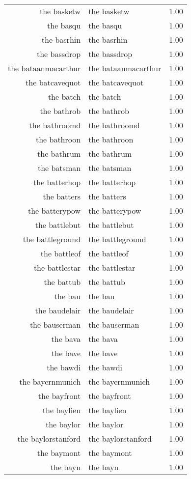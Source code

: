 \begin{table}[ht]
\begin{tabular}{rlr}
  the basketw & the basketw & 1.00 \\ 
  the basqu & the basqu & 1.00 \\ 
  the basrhin & the basrhin & 1.00 \\ 
  the bassdrop & the bassdrop & 1.00 \\ 
  the bataanmacarthur & the bataanmacarthur & 1.00 \\ 
  the batcavequot & the batcavequot & 1.00 \\ 
  the batch & the batch & 1.00 \\ 
  the bathrob & the bathrob & 1.00 \\ 
  the bathroomd & the bathroomd & 1.00 \\ 
  the bathroon & the bathroon & 1.00 \\ 
  the bathrum & the bathrum & 1.00 \\ 
  the batsman & the batsman & 1.00 \\ 
  the batterhop & the batterhop & 1.00 \\ 
  the batters & the batters & 1.00 \\ 
  the batterypow & the batterypow & 1.00 \\ 
  the battlebut & the battlebut & 1.00 \\ 
  the battleground & the battleground & 1.00 \\ 
  the battleof & the battleof & 1.00 \\ 
  the battlestar & the battlestar & 1.00 \\ 
  the battub & the battub & 1.00 \\ 
  the bau & the bau & 1.00 \\ 
  the baudelair & the baudelair & 1.00 \\ 
  the bauserman & the bauserman & 1.00 \\ 
  the bava & the bava & 1.00 \\ 
  the bave & the bave & 1.00 \\ 
  the bawdi & the bawdi & 1.00 \\ 
  the bayernmunich & the bayernmunich & 1.00 \\ 
  the bayfront & the bayfront & 1.00 \\ 
  the baylien & the baylien & 1.00 \\ 
  the baylor & the baylor & 1.00 \\ 
  the baylorstanford & the baylorstanford & 1.00 \\ 
  the baymont & the baymont & 1.00 \\ 
  the bayn & the bayn & 1.00 \\ 

\end{tabular}
\end{table}
